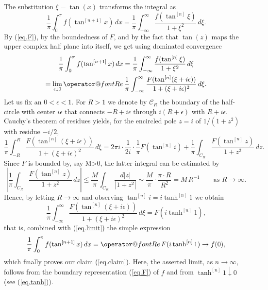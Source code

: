 \documentclass[10pt]{amsart}
\makeatletter
\renewcommand{\leq}{\leqslant}
\renewcommand{\Re}{{\operator@font Re\,}}
\makeatother
\begin{document}
The substitution $\xi = \tan(x)$ transforms the integral as
\begin{equation}\label{eq.trans}
\frac{1}{\pi} \int_0^\pi f(\tan^{[n+1]}x)\,dx = \frac{1}{\pi} \int_{-\infty}^\infty \frac{f(\tan^{[n]}\xi)}{1+\xi^2}\,d\xi.
\end{equation}
By (\ref{eq.F}), by the boundedness of $F$, and by the fact that $\tan(z)$ maps the upper complex half plane into itself, we get using dominated convergence
\begin{multline}\label{eq.limit}
\frac{1}{\pi} \int_0^\pi f(\tan^{[n+1]}x)\,dx = \frac{1}{\pi} \int_{-\infty}^\infty \frac{f(\tan^{[n]}\xi)}{1+\xi^2}\,d\xi \\
= \lim_{\epsilon\downarrow 0} \Re \frac{1}{\pi} \int_{-\infty}^\infty \frac{F(\tan^{[n]}(\xi+i\epsilon))}{1+(\xi+i\epsilon)^2}\,d\xi.
\end{multline}
Let us fix an $0 < \epsilon < 1$. For $R>1$ we denote by $\mathcal{C}_R$ the boundary of the half-circle with center $i\epsilon$ that connects $-R+i\epsilon$ through
$i(R+\epsilon)$ with $R+i\epsilon$. Cauchy's theorem of residues yields, for the encircled pole $z=i$ of $1/(1+z^2)$ with residue $-i/2$,
\[
\frac{1}{\pi} \int_{-R}^R \frac{F(\tan^{[n]}(\xi+i\epsilon))}{1+(\xi+i\epsilon)^2}\,d\xi =
2\pi i \cdot \frac{1}{2i}\cdot\frac{1}{\pi}F(\tan^{[n]}i) + \frac{1}{\pi} \int_{C_R} \frac{F(\tan^{[n]}z)}{1+z^2}\,dz.
\]
Since $F$ is bounded by, say M>0, the latter integral can be estimated by
\[
\left| \frac{1}{\pi} \int_{C_R} \frac{F(\tan^{[n]}z)}{1+z^2}\,dz\right| \leq \frac{M}{\pi} \int_{C_R} \frac{d|z|}{|1+z^2|} \sim \frac{M}{\pi} \cdot \frac{\pi \cdot R}{R^2} = M \,R^{-1}\qquad
\text{as $R\to \infty$}.
\]
Hence, by letting $R \to \infty$ and observing $\tan^{[n]} i = i \tanh^{[n]}1$ we obtain
\[
\frac{1}{\pi} \int_{-\infty}^\infty \frac{F(\tan^{[n]}(\xi+i\epsilon))}{1+(\xi+i\epsilon)^2}\,d\xi = F(i \tanh^{[n]}1),
\]
that is, combined with (\ref{eq.limit}) the simple expression
\begin{equation}\label{eq.Qexpl}
{\frac{1}{\pi} \int_0^\pi f(\tan^{[n+1]}x)\,dx = \Re F(i \tanh^{[n]}1) \to f(0),}
\end{equation}
which finally proves our claim (\ref{eq.claim}). Here, the asserted limit, as $n \to \infty$, follows from the boundary representation (\ref{eq.F}) of $f$ and from $\tanh^{[n]}1 \downarrow 0$ (see (\ref{eq.tanh})).

\bigskip
\end{document}
